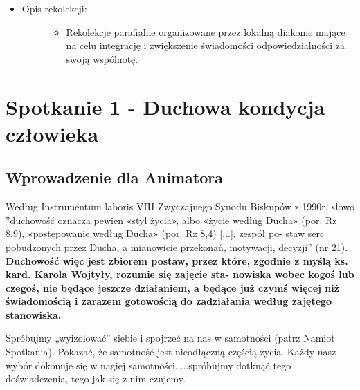 \documentclass[a5paper,10pt,polish]{book}
\begin{document}
\begin{itemize}
\begin{description}
\begin{itemize}
\end{itemize}

\end{description}

\item {} \begin{description}
\item[{Opis rekolekcji:}] \leavevmode\begin{itemize}
\item {} 
Rekolekcje parafialne organizowane przez lokalną diakonie mające na celu integrację i zwiększenie świadomości odpowiedzialności za swoją wspólnotę.

\end{itemize}

\end{description}

\end{itemize}


\chapter{Spotkanie 1 - Duchowa kondycja człowieka}
\label{babice2006-wiosna-knurow/spotkanie1:spotkanie-1-duchowa-kondycja-czlowieka}\label{babice2006-wiosna-knurow/spotkanie1::doc}

\section{Wprowadzenie dla Animatora}
\label{babice2006-wiosna-knurow/spotkanie1:wprowadzenie-dla-animatora}
Według Instrumentum laboris VIII Zwyczajnego Synodu Biskupów z 1990r. słowo ”duchowość oznacza pewien «styl życia», albo «życie według Ducha» (por. Rz 8,9), «postępowanie według Ducha» (por. Rz 8,4) {[}...{]}, zespół po- staw serc  pobudzonych przez Ducha, a mianowicie  przekonań, motywacji, decyzji” (nr 21). \textbf{Duchowość więc jest zbiorem postaw, przez które, zgodnie z myślą ks. kard. Karola  Wojtyły, rozumie się zajęcie sta- nowiska wobec kogoś lub  czegoś, nie będące jeszcze działaniem, a będące już czymś więcej niż świadomością i zarazem gotowością do zadziałania  według zajętego stanowiska.}

Spróbujmy „wyizolować” siebie i spojrzeć na nas w samotności (patrz Namiot Spotkania). Pokazać,  że samotność  jest nieodłączną częścią życia. Każdy nasz wybór dokonuje się w nagiej samotności.....spróbujmy dotknąć tego doświadczenia, tego jak się z nim czujemy.
\end{document}
